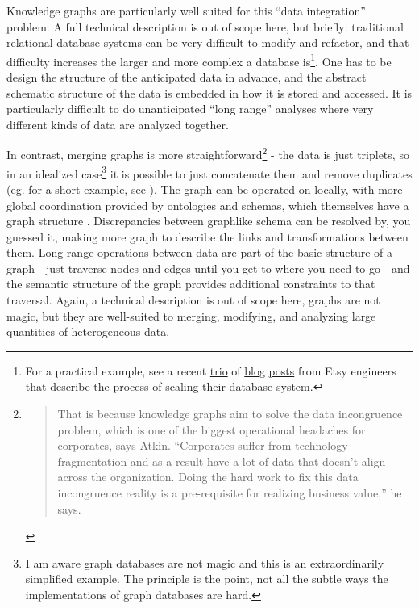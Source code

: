 Knowledge graphs are particularly well suited for this ``data
integration'' problem. A full technical description is out of scope
here, but briefly: traditional relational database systems can be very
difficult to modify and refactor, and that difficulty increases the
larger and more complex a database is\footnote{For a practical example,
  see a recent
  \href{https://www.etsy.com/codeascraft/scaling-etsy-payments-with-vitess-part-1--the-data-model}{trio}
  of
  \href{https://www.etsy.com/codeascraft/scaling-etsy-payments-with-vitess-part-2--the-seamless-migration}{blog}
  \href{https://www.etsy.com/codeascraft/scaling-etsy-payments-with-vitess-part-3--reducing-cutover-risk}{posts}
  from Etsy engineers that describe the process of scaling their
  database system.}. One has to be design the structure of the
anticipated data in advance, and the abstract schematic structure of the
data is embedded in how it is stored and accessed. It is particularly
difficult to do unanticipated ``long range'' analyses where very
different kinds of data are analyzed together.

In contrast, merging graphs is more straightforward\footnote{\begin{quote}
  That is because knowledge graphs aim to solve the data incongruence
  problem, which is one of the biggest operational headaches for
  corporates, says Atkin. ``Corporates suffer from technology
  fragmentation and as a result have a lot of data that doesn't align
  across the organization. Doing the hard work to fix this data
  incongruence reality is a pre-requisite for realizing business
  value,'' he says. \cite{schenkerNewReportDetails2021} 
  \end{quote}} \cite{chaudhriKnowledgeGraphsIntroduction2022, enterpriseknowledgegraphfoundationKnowledgeGraphIndustry2022, schenkerNewReportDetails2021, sequedaDesigningBuildingEnterprise2021, azziniAdvancesDataManagement2021, segaranTwophaseConstructionData2020, ceravoloBigDataSemantics2018, natarajanGraphKnowledgeGraph}  - the
data is just triplets, so in an idealized case\footnote{I am aware graph
  databases are not magic and this is an extraordinarily simplified
  example. The principle is the point, not all the subtle ways the
  implementations of graph databases are hard.} it is possible to just
concatenate them and remove duplicates (eg. for a short example, see
\cite{allemangMergingDataGraphs2022, allemangMergingTablesHard2022} ). The graph can be operated on locally, with more global
coordination provided by ontologies and schemas, which themselves have a
graph structure \cite{villazon-terrazasKnowledgeGraphFoundations2017} . Discrepancies between graphlike schema can be resolved by, you
guessed it, making more graph to describe the links and transformations
between them. Long-range operations between data are part of the basic
structure of a graph - just traverse nodes and edges until you get to
where you need to go - and the semantic structure of the graph provides
additional constraints to that traversal. Again, a technical description
is out of scope here, graphs are not magic, but they are well-suited to
merging, modifying, and analyzing large quantities of heterogeneous
data.

